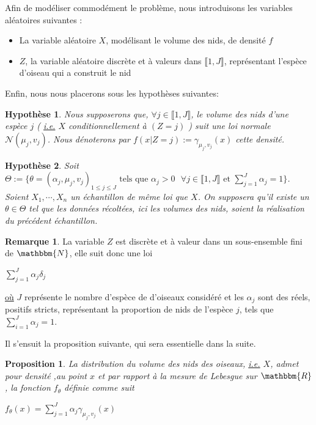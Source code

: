 \documentclass[frenchb]{report}
\newcommand{\R}{\mathbbm{R}}
\newcommand{\N}{\mathbbm{N}}
\newcommand{\1}{\mathbbm{1}}
\newcommand{\n}{\mathcal{N}}
\newtheorem{prop}{Proposition}
\newtheorem{hyp}{Hypothèse}
\theoremstyle{definition}\newtheorem{defn}{Définition}
\theoremstyle{definition}\newtheorem{exm}{Exemple}
\theoremstyle{definition}\newtheorem{nota}{Notation}
\theoremstyle{definition}\newtheorem{rem}{Remarque}
\begin{document}
Afin de modéliser commodément le problème, nous introduisons les variables aléatoires suivantes :

\begin{itemize}[label=\adfflowerleft]
	\item La variable aléatoire $X$, modélisant le volume des nids, de densité $f$
	\item $Z$, la variable aléatoire discrète et à valeurs dans $\llbracket 1,J\rrbracket$, représentant l'espèce d'oiseau qui a construit le nid
\end{itemize}

Enfin, nous nous placerons sous les hypothèses suivantes:

\begin{hyp}
Nous supposerons que, $\forall j\in \llbracket 1,J \rrbracket$, le volume des nids d'une espèce $j$ ( \underline{i.e.} $X$ conditionnellement à $(Z=j)$ ) suit une loi normale $\n(\mu_j,v_j)$. Nous dénoterons par $f(x | Z = j) := \gamma_{\mu_j, v_j}(x)$ cette densité.
\end{hyp}


\begin{hyp}
Soit $\Theta := \{ \theta = (\alpha_j,\mu_j, v_j)_{1 \leq j \leq J} \text{ tels que } \alpha_j > 0 \text{ } \forall j\in \llbracket 1,J\rrbracket \text{ et } \displaystyle\sum_{j=1}^J\alpha_j=1\}$. Soient $X_1, \cdots, X_n$ un échantillon de même loi que $X$. On supposera qu'il existe un $\theta \in \Theta$ tel que les données récoltées, ici les volumes des nids, soient la réalisation du précédent échantillon.
\end{hyp}

\begin{rem}
La variable $Z$ est discrète et à valeur dans un sous-ensemble fini de $\N$, elle suit donc une loi 
\begin{center} $\displaystyle \sum_{j=1}^J \alpha_j\delta_j$ \end{center}
\underline{où} $J$ représente le nombre d'espèce de d'oiseaux considéré et les $\alpha_j$ sont des réels, positifs stricts, représentant la proportion de nids de l'espèce $j$, tels que $\displaystyle\sum_{i=1}^J \alpha_j = 1$.
\end{rem}

Il s'ensuit la proposition suivante, qui sera essentielle dans la suite.
\begin{prop}
La distribution du volume des nids des oiseaux, \underline{i.e.} $X$, admet pour densité ,au point $x$ et par rapport à la mesure de Lebesgue sur $\R$, la fonction $f_ \theta$ définie comme suit
\begin{center} $f_\theta(x) = \displaystyle\sum_{j=1}^J \alpha_j \gamma_{\mu_j, v_j}(x) $ \end{center}
\end{prop}
\end{document}
